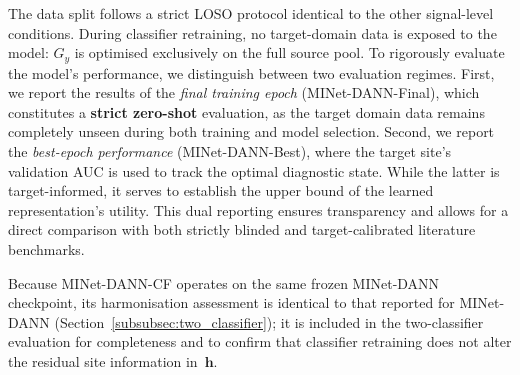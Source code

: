 \documentclass[preprint,12pt]{elsarticle}
\begin{document}
The data split follows a strict LOSO protocol identical to the other
signal-level conditions.
During classifier retraining, no target-domain data is exposed to the
model: $G_y$ is optimised exclusively on the full source pool.
To rigorously evaluate the model's performance, we distinguish between two evaluation regimes.
First, we report the results of the \textit{final training epoch} (MINet-DANN-Final), which constitutes a \textbf{strict zero-shot} evaluation, as the target domain data remains completely unseen during both training and model selection.
Second, we report the \textit{best-epoch performance} (MINet-DANN-Best), where the target site's validation AUC is used to track the optimal diagnostic state. While the latter is target-informed, it serves to establish the upper bound of the learned representation's utility.
This dual reporting ensures transparency and allows for a direct comparison with both strictly blinded and target-calibrated literature benchmarks.

Because MINet-DANN-CF operates on the same frozen MINet-DANN
checkpoint, its harmonisation assessment is identical to that
reported for MINet-DANN (Section~\ref{subsubsec:two_classifier});
it is included in the two-classifier evaluation for completeness and
to confirm that classifier retraining does not alter the residual
site information in~$\mathbf{h}$.

\end{document}
